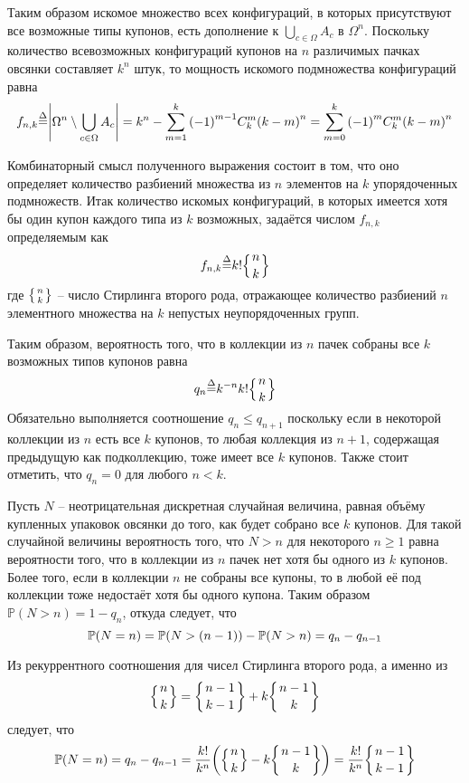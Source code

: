 \documentclass[a4paper]{article}
\let\originalleft\left
\let\originalright\right
\renewcommand{\left}{\mathopen{}\mathclose\bgroup\originalleft}
\renewcommand{\right}{\aftergroup\egroup\originalright}
\newcommand{\obj}[1]{{\left\{ #1 \right \}}}
\newcommand{\brac}[1]{{\left ( #1 \right )}}
\newcommand{\abs}[1]{{\left | #1 \right |}}
\newcommand{\pr}[0]{{\mathbb{P}}}
\newcommand{\defn}{{\mathop{\overset{\Delta}{=}}\nolimits}}
\begin{document}
Таким образом искомое множество всех конфигураций, в которых присутствуют все
возможные типы купонов, есть дополнение к $\bigcup_{c\in \Omega}A_c$ в $\Omega^n$.
Поскольку количество всевозможных конфигураций купонов на $n$ различимых
пачках овсянки составляет $k^n$ штук, то мощность искомого подмножества
конфигураций равна
\[f_{n,k} \defn \abs{\Omega^n\setminus \bigcup_{c\in \Omega}A_c }
= k^n - \sum_{m=1}^k \brac{-1}^{m-1} C^m_k \brac{k - m}^n
= \sum_{m=0}^k \brac{-1}^m C^m_k \brac{k - m}^n \]

Комбинаторный смысл полученного выражения состоит в том, что оно определяет
количество разбиений множества из $n$ элементов на $k$ упорядоченных
подмножеств.
Итак количество искомых конфигураций, в которых имеется хотя бы один купон
каждого типа из $k$ возможных, задаётся числом $f_{n,k}$ определяемым как
\[f_{n,k} \defn  k! \obj{n \atop k}\]
где $\obj{n \atop k}$ -- число Стирлинга второго
рода, отражающее количество разбиений $n$ элементного множества на $k$
непустых неупорядоченных групп.

Таким образом, вероятность того, что в коллекции из $n$ пачек собраны все $k$
возможных типов купонов равна
\[q_n \defn k^{-n} k! \obj{n \atop k}\]
Обязательно выполняется соотношение $q_n\leq q_{n+1}$ поскольку если в
некоторой коллекции из $n$ есть все $k$ купонов, то любая коллекция из $n+1$,
содержащая предыдущую как подколлекцию, тоже имеет все $k$ купонов.
Также стоит отметить, что $q_n = 0$ для любого $n<k$.

Пусть $N$ -- неотрицательная дискретная случайная величина, равная объёму
купленных упаковок овсянки до того, как будет собрано все $k$ купонов.
Для такой случайной величины вероятность того, что $N>n$ для некоторого $n\geq1$
равна вероятности того, что в коллекции из $n$ пачек нет хотя бы одного из $k$
купонов.
Более того, если в коллекции $n$ не собраны все купоны, то в любой её под
коллекции тоже недостаёт хотя бы одного купона.
Таким образом $\pr(N>n) = 1-q_n$, откуда следует, что
\[\pr(N=n) = \pr\brac{N>(n-1)} - \pr(N>n) = q_n - q_{n-1} \]

Из рекуррентного соотношения для чисел Стирлинга второго рода, а именно из
\[\obj{n \atop k}
	= \obj{n-1 \atop k-1} + k \obj{n-1 \atop k}\]
следует, что 
\[\pr(N=n) = q_n - q_{n-1}
	= \frac{k!}{k^n}\brac{ \obj{n \atop k} - k\obj{n-1 \atop k} }
	= \frac{k!}{k^n} \obj{n-1 \atop k-1}\]
\end{document}
